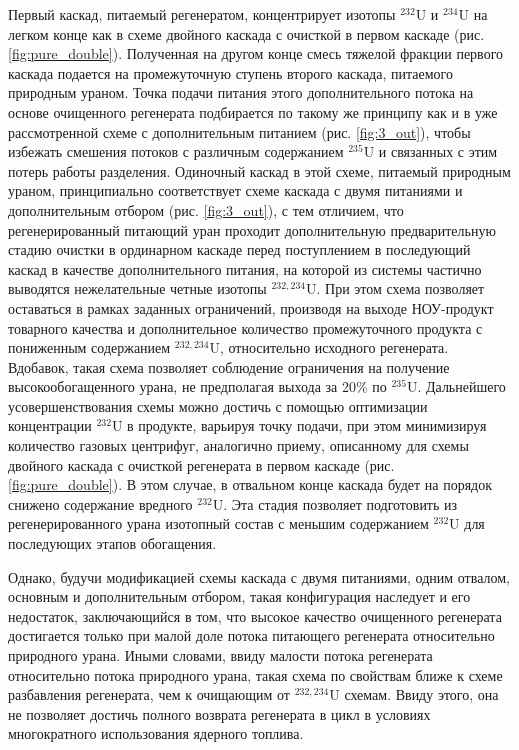 Первый каскад, питаемый регенератом, концентрирует изотопы $^{232}$U и $^{234}$U на легком конце как в схеме двойного каскада с очисткой в первом каскаде (рис. \ref{fig:pure_double}). Полученная на другом конце смесь тяжелой фракции первого каскада подается на промежуточную ступень второго каскада, питаемого природным ураном. Точка подачи питания этого дополнительного потока на основе очищенного регенерата подбирается по такому же принципу как и в уже рассмотренной схеме с дополнительным питанием (рис. \ref{fig:3_out}), чтобы избежать смешения потоков с различным содержанием $^{235}$U и связанных с этим потерь работы разделения. Одиночный каскад в этой схеме, питаемый природным ураном, принципиально соответствует схеме каскада с двумя питаниями и дополнительным отбором (рис. \ref{fig:3_out}), с тем отличием, что регенерированный питающий уран проходит дополнительную предварительную стадию очистки в ординарном каскаде перед поступлением в последующий каскад в качестве дополнительного питания, на которой из системы частично выводятся нежелательные четные изотопы $^{232,234}$U. При этом схема позволяет оставаться в рамках заданных ограничений, производя на выходе НОУ-продукт товарного качества и дополнительное количество промежуточного продукта с пониженным содержанием $^{232,234}$U, относительно исходного регенерата. Вдобавок, такая схема позволяет соблюдение ограничения на получение высокообогащенного урана, не предполагая выхода за 20\% по  $^{235}$U.
Дальнейшего усовершенствования схемы можно достичь с помощью оптимизации концентрации $^{232}$U в продукте, варьируя точку подачи, при этом минимизируя количество газовых центрифуг, аналогично приему, описанному для схемы двойного каскада с очисткой регенерата в первом каскаде (рис. \ref{fig:pure_double}). В этом случае, в отвальном конце каскада будет на порядок снижено содержание вредного $^{232}$U. Эта стадия позволяет подготовить из регенерированного урана изотопный состав с меньшим содержанием $^{232}$U для последующих этапов обогащения.

Однако, будучи модификацией схемы каскада с двумя питаниями, одним отвалом, основным и дополнительным отбором, такая конфигурация наследует и его недостаток, заключающийся в том, что высокое качество очищенного регенерата достигается только при малой доле потока питающего регенерата относительно природного урана. Иными словами, ввиду малости потока регенерата относительно потока природного урана, такая схема по свойствам ближе к схеме разбавления регенерата, чем к очищающим от $^{232,234}$U схемам. Ввиду этого, она не позволяет достичь полного возврата регенерата в цикл в условиях многократного использования ядерного топлива.



